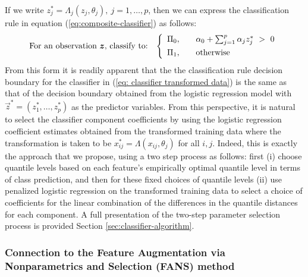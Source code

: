 If we write $z_j^{*} = \Lambda_j (z_j, \theta_j),~ j = 1, \dots, p$, then we can
express the classification rule in equation
(\ref{eq:composite-classifier}) as follows:
\begin{equation}
  \label{eq: classifier transformed data}
  \text{For an observation $\vec{z}$, classify to:} \hspace{3mm} \left\{ 
    \begin{array}{lcl}
      \Pi_0, & & \alpha_0 + \sum_{j = 1}^p \alpha_j z_j^{*} ~>~ 0 \\[1ex]
      \Pi_1, & & \text{otherwise} \\[0ex]
    \end{array}
  \right.
\end{equation}
From this form it is readily apparent that the the classification rule decision
boundary for the classifier in (\ref{eq: classifier transformed data}) is the
same as that of the decision boundary obtained from the logistic regression
model with $\vec{z}^{*} = (z_1^{*}, \dots, z_p^{*})$ as the predictor variables.
From this perspective, it is natural to select the classifier component
coefficients by using the logistic regression coefficient estimates obtained
from the transformed training data where the transformation is taken to be
$x_{ij}^{*} = \Lambda(x_{ij}, \theta_j)$ for all $i, j$.  Indeed, this is
exactly the approach that we propose, using a two step process as follows: first
(i) choose quantile levels based on each feature's empirically optimal quantile
level in terms of class prediction, and then for these fixed choices of quantile
levels (ii) use penalized logistic regression on the transformed training data
to select a choice of coefficients for the linear combination of the differences
in the quantile distances for each component.  A full presentation of the
two-step parameter selection process is provided Section
\ref{sec:classifier-algorithm}.




\subsubsection{Connection to the Feature Augmentation via Nonparametrics and
  Selection (FANS) method}
\label{sec:similarites-to-fans}

